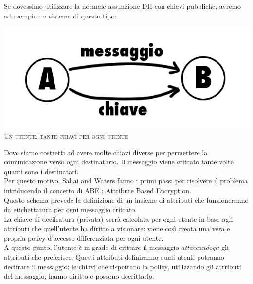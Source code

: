 Se dovessimo utilizzare la normale assunzione DH con chiavi pubbliche, avremo ad esempio un sistema di questo tipo:

\begin{center}
\begin{minipage}[c]{0.9\textwidth}
		\centering
		\includegraphics[keepaspectratio,width=\textwidth]{keying.png}\\
		{\small\scshape Un utente, tante chiavi per ogni utente}
\end{minipage}
\end{center}

Dove siamo costretti ad avere molte chiavi diverse per permettere la comunicazione verso ogni destinatario. Il messaggio viene crittato tante volte quanti sono i destinatari.\\[0.3cm]

Per questo motivo, Sahai and Waters \cite{sahai} fanno i primi passi per risolvere il problema intriducendo il concetto di ABE : Attribute Based Encryption.\\
Questo schema prevede la definizione di un insieme di attributi che funzioneranno da etichettatura per ogni messaggio crittato.\\
La chiave di decifratura (privata) verrà calcolata per ogni utente in base agli attributi che quell'utente ha diritto a visionare: viene così creata una vera e propria policy d'accesso differenziata per ogni utente.\\
A questo punto, l'utente è in grado di crittare il messaggio \emph{attaccandogli} gli attributi che preferisce. Questi attributi definiranno quali utenti potranno decifrare il messaggio: le chiavi che rispettano la policy, utilizzando gli attributi del messaggio, hanno diritto e possono decrittarlo.\\[0.2cm]

